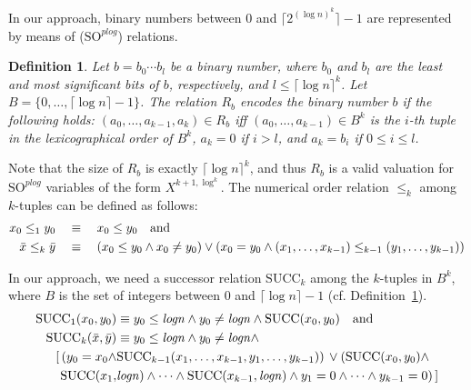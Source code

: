 \documentclass{article}
\newtheorem{definition}{Definition}
\begin{document}
In our approach, binary numbers between $0$ and $\lceil 2^{(\log n)^k} \rceil - 1$ are represented by means of ($\mathrm{SO}^{\mathit{plog}}$) relations. 
\begin{definition}\label{def:repBinaryNumbers}
Let $b = b_0 \cdots b_l$ be a binary number, where $b_0$ and $b_l$ are the least and most significant bits of $b$, respectively, and $l \leq \lceil \log n \rceil^k$. Let $B = \{0, \ldots, \lceil \log n \rceil -1\}$. The relation $R_b$ \emph{encodes the binary number} $b$ if the following holds: $(a_0, \ldots, a_{k-1}, a_k) \in R_b$ iff $(a_0, \ldots, a_{k-1}) \in B^k$ is the $i$-th tuple in the lexicographical order of $B^k$, $a_k = 0$ if $i > l$, and $a_k = b_i$ if $0 \leq i \leq l$. 
\end{definition}

Note that the size of $R_b$ is exactly $\lceil \log n \rceil^k$, and thus $R_b$ is a valid valuation for $\mathrm{SO}^{\mathit{plog}}$ variables of the form $X^{k+1, \log^k}$.
The numerical order relation $\leq_k$ among $k$-tuples can be defined as follows: 
\begin{align}
x_0 \leq_1 y_0 \quad &\equiv \quad x_0 \leq y_0 \quad \text{and} \notag\\
\bar{x} \leq_k \bar{y} \quad &\equiv \quad (x_0 \leq y_0 \wedge x_0 \neq y_0) \vee (x_0 = y_0 \wedge (x_1, \ldots, x_{k-1}) \leq_{k-1} (y_1, \ldots, y_{k-1})) \label{arith1}
\end{align}

In our approach, we need a successor relation $\mathrm{SUCC}_k$ among the $k$-tuples in $B^k$, where $B$ is the set of integers between $0$ and $\lceil \log n \rceil-1$ (cf. Definition~\ref{def:repBinaryNumbers}). 
\begin{align}
  \mathrm{SUCC}_1(x_0,y_0) &\equiv y_0 \leq \mathit{logn} \wedge y_0 \neq \mathit{logn} \wedge \mathrm{SUCC}(x_0,y_0) \quad \text{and} \notag\\
\mathrm{SUCC}_k(\bar{x},\bar{y}) &\equiv y_0 \leq \mathit{logn} \wedge y_0 \neq \mathit{logn} \wedge \notag \\
[\, (y_0 = x_0 \wedge & \mathrm{SUCC}_{k-1}(x_1,\dots,x_{k-1},y_1,\dots,y_{k-1})) \, \vee (\mathrm{SUCC}(x_0, y_0) \wedge \notag\\
\mathrm{SUCC} (x_1, & \mathit{logn}) \wedge \cdots \wedge \mathrm{SUCC}(x_{k-1},\mathit{logn}) \wedge y_1= 0 \wedge \cdots \wedge y_{k-1}=0)\, \label{arith2}]
\end{align}
\end{document}
